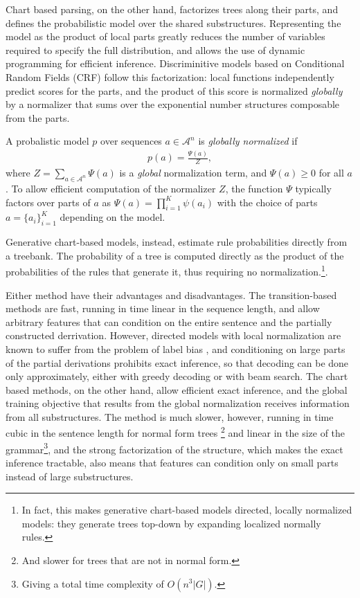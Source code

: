     Chart based parsing, on the other hand, factorizes trees along their parts, and defines the probabilistic model over the shared substructures. Representing the model as the product of local parts greatly reduces the number of variables required to specify the full distribution, and allows the use of dynamic programming for efficient inference. Discriminitive models based on Conditional Random Fields (CRF) \citep{lafferty2001crf} follow this factorization: local functions independently predict scores for the parts, and the product of this score is normalized \textit{globally} by a normalizer that sums over the exponential number structures composable from the parts.
    \begin{definition}{}
      A probalistic model $p$ over sequences $a \in \mathcal{A}^n$ is \textit{globally normalized} if
      \begin{align*}
        p(a) = \frac{ \Psi( a ) }{ Z },
      \end{align*}
      where $Z  = \sum_{a \in \mathcal{A}^n} \Psi( a )$ is a \textit{global} normalization term, and $\Psi( a ) \geq 0$ for all $a$. To allow efficient computation of the normalizer $Z$, the function $\Psi$ typically factors over parts of $a$ as $\Psi ( a ) = \prod_{i=1}^K \psi (a_i )$ with the choice of parts $a = \{a_i\}_{i=1}^K$ depending on the model.
    \end{definition}
    Generative chart-based models, instead, estimate rule probabilities directly from a treebank. The probability of a tree is computed directly as the product of the probabilities of the rules that generate it, thus requiring no normalization.\footnote{In fact, this makes generative chart-based models directed, locally normalized models: they generate trees top-down by expanding localized normally rules.}.

    Either method have their advantages and disadvantages. The transition-based methods are fast, running in time linear in the sequence length, and allow arbitrary features that can condition on the entire sentence and the partially constructed derrivation. However, directed models with local normalization are known to suffer from the problem of label bias \citep{lafferty2001crf}, and conditioning on large parts of the partial derivations prohibits exact inference, so that decoding can be done only approximately, either with greedy decoding or with beam search. The chart based methods, on the other hand, allow efficient exact inference, and the global training objective that results from the global normalization  receives information from all substructures. The method is much slower, however, running in time cubic in the sentence length for normal form trees \footnote{And slower for trees that are not in normal form.} and linear in the size of the grammar\footnote{Giving a total time complexity of $O(n^3|G|)$.}, and the strong factorization of the structure, which makes the exact inference tractable, also means that features can condition only on small parts instead of large substructures.

